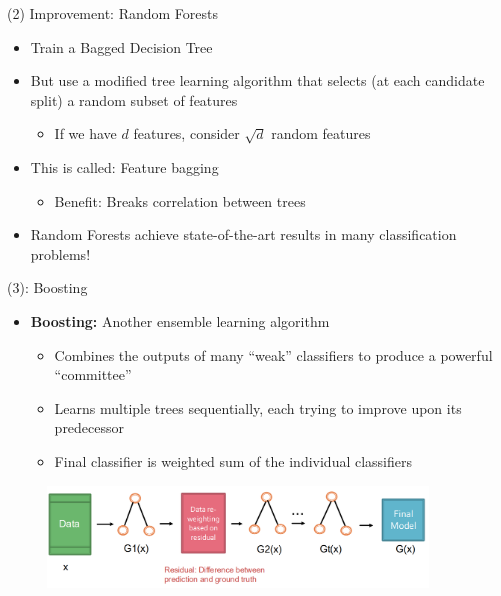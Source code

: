 \begin{frame}[allowframebreaks]{(2) Improvement: Random Forests}
\begin{itemize}
    \item Train a Bagged Decision Tree
    \item But use a modified tree learning algorithm that selects (at each candidate split) a random subset of features
    \begin{itemize}
        \item If we have $d$ features, consider $\sqrt{d}$ random features
    \end{itemize}
    \item This is called: Feature bagging
    \begin{itemize}
        \item Benefit: Breaks correlation between trees
    \end{itemize}
    \item Random Forests achieve state-of-the-art results in many classification problems!
\end{itemize}
\end{frame}

\begin{frame}[allowframebreaks]{(3): Boosting}
\begin{itemize}
    \item \textbf{Boosting:} Another ensemble learning algorithm
    \begin{itemize}
        \item Combines the outputs of many ``weak'' classifiers to produce a powerful ``committee''
        \item Learns multiple trees sequentially, each trying to improve upon its predecessor
        \item Final classifier is weighted sum of the individual classifiers
    \end{itemize}
\end{itemize}

\begin{figure}[h]
    \centering
    \includegraphics[width=0.9\textwidth]{images/decision-trees/decision-trees-15.png}
\end{figure}

\end{frame}


